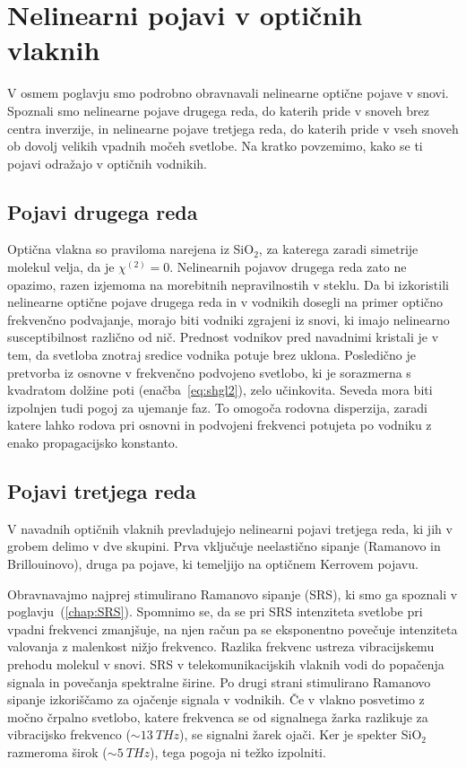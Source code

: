 \section{Nelinearni pojavi v optičnih vlaknih}
\label{NLOFIB}
V osmem poglavju smo podrobno obravnavali nelinearne optične pojave v snovi.
Spoznali smo nelinearne pojave drugega reda, do katerih pride v snoveh brez centra inverzije, 
in nelinearne pojave tretjega reda, do katerih pride v vseh snoveh ob dovolj velikih vpadnih
močeh svetlobe. Na kratko povzemimo, kako se ti pojavi odražajo v optičnih vodnikih. 

\subsection*{Pojavi drugega reda}
Optična vlakna so praviloma narejena iz SiO$_2$, 
za katerega zaradi simetrije molekul velja, da je $\chi^{(2)}=0$. 
Nelinearnih pojavov drugega reda zato ne opazimo, razen izjemoma na morebitnih 
nepravilnostih v steklu.
Da bi izkoristili nelinearne optične pojave
drugega reda in v vodnikih dosegli na primer optično frekvenčno podvajanje,
morajo biti vodniki zgrajeni iz snovi, ki imajo nelinearno susceptibilnost 
različno od nič. Prednost vodnikov pred navadnimi kristali je v tem, 
da svetloba znotraj sredice vodnika potuje brez uklona. Posledično je
pretvorba iz osnovne v frekvenčno podvojeno svetlobo, ki je sorazmerna s kvadratom 
dolžine poti (enačba~\ref{eq:shgl2}), zelo učinkovita. Seveda 
mora biti izpolnjen tudi pogoj za ujemanje faz. To 
omogoča rodovna disperzija, zaradi 
katere lahko rodova pri osnovni in podvojeni frekvenci potujeta po vodniku
z enako propagacijsko konstanto.

\subsection*{Pojavi tretjega reda}
V navadnih optičnih vlaknih  
prevladujejo nelinearni pojavi tretjega reda, ki jih v grobem delimo v dve skupini. Prva vključuje
neelastično sipanje (Ramanovo in Brillouinovo), druga pa pojave, ki 
temeljijo na optičnem Kerrovem pojavu.

Obravnavajmo najprej stimulirano Ramanovo sipanje 
(SRS), ki smo
ga spoznali v poglavju~(\ref{chap:SRS}). Spomnimo se, da se pri SRS intenziteta
svetlobe pri vpadni frekvenci zmanjšuje, na njen račun pa se eksponentno povečuje 
intenziteta valovanja z malenkost nižjo frekvenco. Razlika frekvenc ustreza
vibracijskemu prehodu molekul v snovi. SRS v telekomunikacijskih vlaknih 
vodi do popačenja signala
in povečanja spektralne širine. Po drugi strani stimulirano Ramanovo sipanje 
izkoriščamo za ojačenje signala v vodnikih. Če v vlakno posvetimo z močno črpalno
svetlobo, katere frekvenca se od signalnega žarka razlikuje za vibracijsko frekvenco
($\sim 13~\si{THz}$), se signalni žarek ojači. Ker je spekter SiO$_2$ razmeroma 
širok ($\sim 5~\si{THz}$), tega pogoja ni težko izpolniti. 

